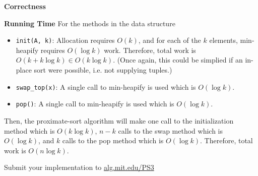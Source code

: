 \documentclass[12pt,twoside]{article}
\begin{document}
\begin{problems}
\begin{problemparts}
    \smallbreak

    {\bf Correctness}

    \smallbreak

    {\bf Running Time} For the methods in the data structure
    \begin{itemize}
        \item {\tt init(A, k)}: Allocation requires $ O(k) $, and for each of
        the $ k $ elements, min-heapify requires $ O(\log k) $ work.
        Therefore, total work is $ O(k + k \log k) \in O( k \log k) $. (Once
        again, this could be simplied if an in-place sort were possible, i.e.
        not supplying tuples.)
        \item {\tt swap\_top(x)}: A single call to min-heapify is used which
        is $ O(\log k) $.
        \item {\tt pop()}: A single call to min-heapify is used which is $
        O(\log k) $.
    \end{itemize}
    Then, the proximate-sort algorithm will make one call to the
    initialization method which is $ O(k \log k) $, $ n - k $ calls to the
    swap method which is $ O(\log k) $, and $ k $ calls to the pop method
    which is $ O(\log k) $. Therefore, total work is $ O(n \log k) $.

\problempart Submit your implementation to {\small\url{alg.mit.edu/PS3}}
\end{problemparts}

\end{problems}
\end{document}
